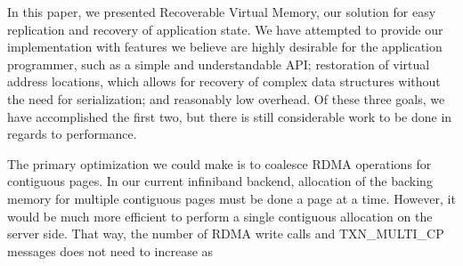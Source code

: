 In this paper, we presented Recoverable Virtual Memory, our solution for easy
replication and recovery of application state. We have attempted to provide
our implementation with features we believe are highly desirable for the
application programmer, such as a simple and understandable API; restoration
of virtual address locations, which allows for recovery of complex data
structures without the need for serialization; and reasonably low overhead.
Of these three goals, we have accomplished the first two, but there is still
considerable work to be done in regards to performance.

The primary optimization we could make is to coalesce RDMA operations for
contiguous pages. In our current infiniband backend, allocation of the backing
memory for multiple contiguous pages must be done a page at a time.
However, it would be much more efficient to perform a single contiguous
allocation on the server side. That way, the number of RDMA write calls and
TXN\_MULTI\_CP messages does not need to increase as 
